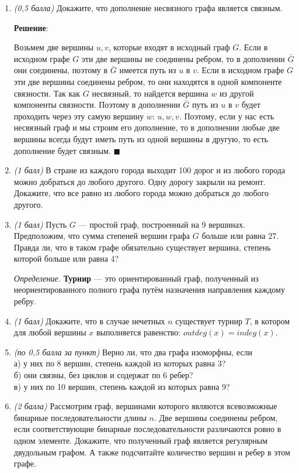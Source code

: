 \documentclass{article}
\begin{document}
\begin{enumerate}

    \item \textit{(0,5 балла)} Докажите, что дополнение несвязного графа является связным.
    
    \textbf{Решение}:

    Возьмем две вершины $u, v$, которые входят в исходный граф $G$. Если в исходном графе $G$ эти две вершины не соединены ребром, то в дополнении $\bar{G}$ они соединены, поэтому в $\bar{G}$ имеется путь из $u$ в $v$. Если в исходном графе $G$ эти две вершины соединены ребром, то они находятся в одной компоненте связности. Так как $G$ несвязный, то найдется вершина $w$ из другой компоненты связности. Поэтому в дополнении $\bar{G}$ путь из $u$ в $v$ будет проходить через эту самую вершину $w$: $u, w, v$. Поэтому, если у нас есть несвязный граф и мы строим его дополнение, то в дополнении любые две вершины всегда будут иметь путь из одной вершины в другую, то есть дополнение будет связным. $\blacksquare$

    \item \textit{(1 балл)} В стране из каждого города выходит 100 дорог и из любого города можно добраться до любого другого. Одну дорогу закрыли на ремонт. Докажите, что все равно из любого города можно добраться до любого другого.
    
    \item \textit{(1 балл)} Пусть $G$ --- простой граф, построенный на 9 вершинах. Предположим, что сумма степеней вершин графа $G$ больше или равна 27. Правда ли, что в таком графе обязательно существует вершина, степень которой больше или равна 4?
    
    \textit{Определение.} \textbf{Турнир} --- это ориентированный граф, полученный из неориентированного полного графа путём назначения направления каждому ребру.
    
    \item \textit{(1 балл)} Докажите, что в случае нечетных $n$ существует турнир $T$, в котором для любой вершины $x$ выполняется равенство: $outdeg(x) = indeg(x)$.
    
    \item \textit{(по 0,5 балла за пункт)} Верно ли, что два графа изоморфны, если\\
    а) у них по 8 вершин, степень каждой из которых равна 3?\\
    б) они связны, без циклов и содержат по 6 ребер?\\
    в) у них по 10 вершин, степень каждой из которых равна 9?
    
    \item \textit{(2 балла)} Рассмотрим граф, вершинами которого являются всевозможные бинарные последовательности длины $n$. Две вершины соединены ребром, если соответствующие бинарные последовательности различаются ровно в одном элементе. Докажите, что полученный граф является регулярным двудольным графом. А также подсчитайте количество вершин и ребер в этом графе.
    
\end{enumerate}
\end{document}
